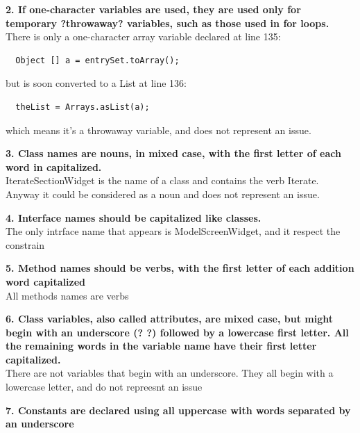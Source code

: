 \documentclass{article}
\begin{document}
\begin{flushleft}
\textbf{2. If one-character variables are used, they are used only for temporary ?throwaway? variables, such as those used in for loops.}\\
\vspace{0.5cm}
There is only a one-character array variable declared at line 135:
\vspace{0.5cm}
\begin{lstlisting}
  Object [] a = entrySet.toArray(); 
  \end{lstlisting}
  but is soon converted to a List at line 136:
  \begin{lstlisting}
  theList = Arrays.asList(a);
  \end{lstlisting}
  \vspace{0.5cm}
  which means it's a throwaway variable, and does not represent an issue.
  \vspace{0.5cm}
   
\textbf{3. Class names are nouns, in mixed case, with the first letter of each word in capitalized.}\\
\vspace{0.5cm}
IterateSectionWidget is the name of a class and contains the verb Iterate. Anyway it could be considered as a noun and does not represent an issue.
\vspace{0.5cm}


\textbf{4. Interface names should be capitalized like classes.}\\
\vspace{0.5cm}
The only intrface name that appears is ModelScreenWidget, and it  respect the constrain
\vspace{0.5cm}


\textbf{5. Method names should be verbs, with the first letter of each addition word capitalized}\\
\vspace{0.5cm}
All methods names are verbs
\vspace{0.5cm}


\textbf{6. Class variables, also called attributes, are mixed case, but might begin with an underscore (? ?) followed by a lowercase first letter. All the remaining words in the variable name have their first letter capitalized.}\\
\vspace{0.5cm}
There are not variables that begin with an underscore. They all begin with a lowercase letter, and do not repreesnt an issue
\vspace{0.5cm}


\textbf{7. Constants are declared using all uppercase with words separated by an underscore}\\
\vspace{0.5cm}


\end{flushleft}
\end{document}
